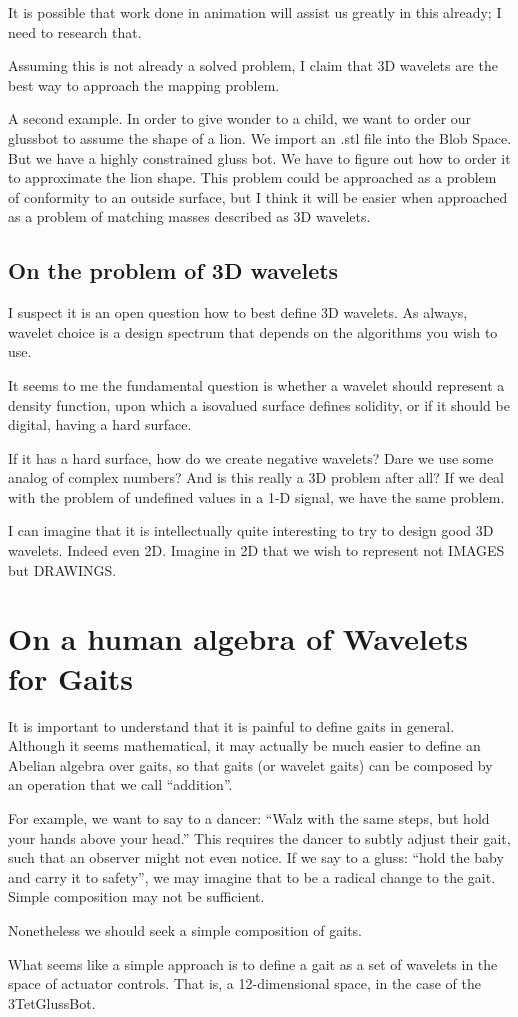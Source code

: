 \documentclass[11pt]{article}
\begin{document}
It is possible that work done in animation will assist us greatly in this already; I need
to research that.

Assuming this is not already a solved problem, I claim that 3D wavelets are the best way
to approach the mapping problem.

A second example.  In order to give wonder to a child, we want to order our glussbot to
assume the shape of a lion. We import an .stl file into the Blob Space.  But we have a highly
constrained gluss bot.  We have to figure out how to order it to approximate the lion shape.
This problem could be approached as a problem of conformity to an outside surface, but I think
it will be easier when approached as a problem of matching masses described as 3D wavelets.

\subsection{On the problem of 3D wavelets}

I suspect it is an open question how to best define 3D wavelets.
As always, wavelet choice is a design spectrum that depends on the algorithms you wish to use.

It seems to me the fundamental question is whether a wavelet should represent a density function,
upon which a isovalued surface defines solidity, or if it should be digital, having a hard surface.

If it has a hard surface, how do we create negative wavelets?  Dare we use some analog of complex
numbers?  And is this really a 3D problem after all?  If we deal with the problem of undefined
values in a 1-D signal, we have the same problem.

I can imagine that it is intellectually quite interesting to try to design good 3D wavelets.
Indeed even 2D.  Imagine in 2D that we wish to represent not IMAGES but DRAWINGS.

\section{On a human algebra of Wavelets for Gaits}

It is important to understand that it is painful to define gaits in general. Although
it seems mathematical, it may actually be much easier to define an Abelian algebra over gaits,
so that gaits (or wavelet gaits) can be composed by an operation that we call ``addition''.

For example, we want to say to a dancer: ``Walz with the same steps, but hold your hands
above your head.'' This requires the dancer to subtly adjust their gait, such that an observer
might not even notice.  If we say to a gluss: ``hold the baby and carry it to safety'', we
may imagine that to be a radical change to the gait.  Simple composition may not be sufficient.

Nonetheless we should seek a simple composition of gaits.

What seems like a simple approach is to define a gait as a set of wavelets in the space
of actuator controls.  That is, a 12-dimensional space, in the case of the 3TetGlussBot.
\end{document}
